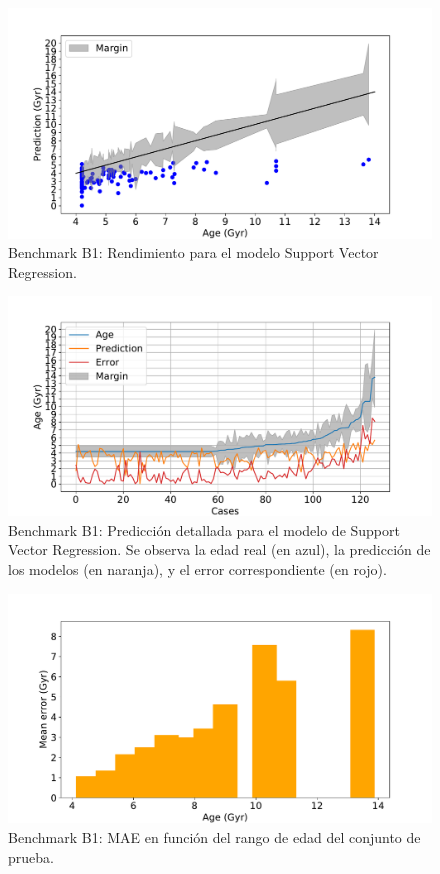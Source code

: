 \begin{figure}[H]
\begin{center}
 \includegraphics[width=0.8\linewidth]{Figuras/Experimentos/B_B1_svm_1.pdf}
\end{center}
\caption{Benchmark B1: Rendimiento para el modelo Support Vector Regression.}
 \label{fig:benchB1_details_svm_1}
\end{figure}

\begin{figure}[H]
\begin{center}
 \includegraphics[width=0.8\linewidth]{Figuras/Experimentos/B_B1_svm_2.pdf}
\end{center}
\caption{Benchmark B1: Predicción detallada para el modelo de Support Vector Regression. Se observa la edad real (en azul), la predicción de los modelos (en naranja), y el error correspondiente (en rojo).}
 \label{fig:benchB1_details_svm_2}
\end{figure}

\begin{figure}[H]
\begin{center}
 \includegraphics[width=0.8\linewidth]{Figuras/Experimentos/B_B1_svm_3.pdf}
\end{center}
\caption{Benchmark B1: MAE en función del rango de edad del conjunto de prueba.}
 \label{fig:benchB1_details_svm_3}
\end{figure}

